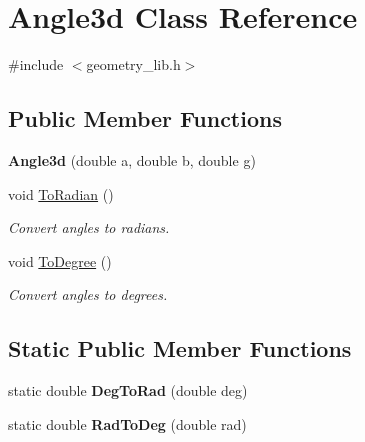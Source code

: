 \hypertarget{class_angle3d}{}\section{Angle3d Class Reference}
\label{class_angle3d}


{\ttfamily \#include $<$geometry\+\_\+lib.\+h$>$}

\subsection*{Public Member Functions}
\begin{DoxyCompactItemize}
\item 
\mbox{\label{class_angle3d_aabb70d79615b478ef4242d657ac4f4c8}} 
{\bfseries Angle3d} (double a, double b, double g)
\item 
\mbox{\label{class_angle3d_a9153e4b5be0fa9862d1f70401650aa67}} 
void \mbox{\hyperlink{class_angle3d_a9153e4b5be0fa9862d1f70401650aa67}{To\+Radian}} ()
\begin{DoxyCompactList}\small\item\em Convert angles to radians. \end{DoxyCompactList}\item 
\mbox{\label{class_angle3d_a2c48f339b1b92add0754b374153f033c}} 
void \mbox{\hyperlink{class_angle3d_a2c48f339b1b92add0754b374153f033c}{To\+Degree}} ()
\begin{DoxyCompactList}\small\item\em Convert angles to degrees. \end{DoxyCompactList}\end{DoxyCompactItemize}
\subsection*{Static Public Member Functions}
\begin{DoxyCompactItemize}
\item 
\mbox{\label{class_angle3d_a39ba639ff0635e821aef18c66296da2e}} 
static double {\bfseries Deg\+To\+Rad} (double deg)
\item 
\mbox{\label{class_angle3d_a9275a9c2042c33edfb642ca4b4ab8a76}} 
static double {\bfseries Rad\+To\+Deg} (double rad)
\end{DoxyCompactItemize}
